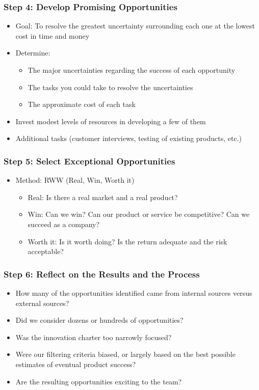 \documentclass[openany,12pt,a4paper]{book}
\begin{document}
\subsubsection{Step 4: Develop Promising Opportunities}
\begin{itemize}
    \item Goal: To resolve the greatest uncertainty surrounding each one at the lowest cost in time and money
    \item Determine:
    \begin{itemize}
        \item The major uncertainties regarding the success of each opportunity
        \item The tasks you could take to resolve the uncertainties
        \item The approximate cost of each task
    \end{itemize}
    \item Invest modest levels of resources in developing a few of them
    \item Additional tasks (customer interviews, testing of existing products, etc.)
\end{itemize}

\subsubsection{Step 5: Select Exceptional Opportunities}
\begin{itemize}
    \item Method: RWW (Real, Win, Worth it)
    \begin{itemize}
        \item Real: Is there a real market and a real product?
        \item Win: Can we win? Can our product or service be competitive? Can we succeed as a company?
        \item Worth it: Is it worth doing? Is the return adequate and the risk acceptable?
    \end{itemize}
\end{itemize}

\subsubsection{Step 6: Reflect on the Results and the Process}
\begin{itemize}
    \item How many of the opportunities identified came from internal sources versus external sources?
    \item Did we consider dozens or hundreds of opportunities?
    \item Was the innovation charter too narrowly focused?
    \item Were our filtering criteria biased, or largely based on the best possible estimates of eventual product success?
    \item Are the resulting opportunities exciting to the team?
\end{itemize}
\end{document}

